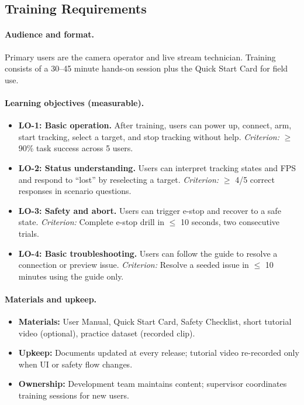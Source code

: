 \documentclass[12pt]{article}
\begin{document}
\subsection{Training Requirements}
\label{subsec:training-reqs}

\paragraph{Audience and format.}
Primary users are the camera operator and live stream technician. Training
consists of a 30–45 minute hands-on session plus the Quick Start Card for field
use.

\paragraph{Learning objectives (measurable).}
\begin{itemize}
  \item \textbf{LO-1: Basic operation.} After training, users can power up, connect, arm, start tracking, select a target, and stop tracking without help. \emph{Criterion:} $\geq$ 90\% task success across 5 users.
  \item \textbf{LO-2: Status understanding.} Users can interpret tracking states and FPS and respond to “lost” by reselecting a target. \emph{Criterion:} $\geq$ 4/5 correct responses in scenario questions.
  \item \textbf{LO-3: Safety and abort.} Users can trigger e-stop and recover to a safe state. \emph{Criterion:} Complete e-stop drill in $\leq$ 10 seconds, two consecutive trials.
  \item \textbf{LO-4: Basic troubleshooting.} Users can follow the guide to resolve a connection or preview issue. \emph{Criterion:} Resolve a seeded issue in $\leq$ 10 minutes using the guide only.
\end{itemize}

\paragraph{Materials and upkeep.}
\begin{itemize}
  \item \textbf{Materials:} User Manual, Quick Start Card, Safety Checklist, short tutorial video (optional), practice dataset (recorded clip).
  \item \textbf{Upkeep:} Documents updated at every release; tutorial video re-recorded only when UI or safety flow changes.
  \item \textbf{Ownership:} Development team maintains content; supervisor coordinates training sessions for new users.
\end{itemize}
\end{document}
